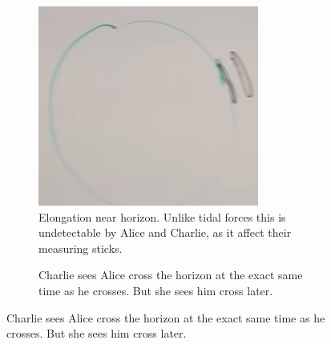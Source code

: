 \documentclass[]{article}
\begin{document}
{\begin{figure}[H]
	\caption{Alice and Charlie at the Event Horizon}
	\begin{subfigure}[t]{0.3\textwidth}
		\caption{Elongation near horizon. Unlike tidal forces this is undetectable by Alice and Charlie, as it affect their measuring sticks.}\label{fig:gr-6-elongation}
		\includegraphics[width=\textwidth]{gr-6-elongation}
	\end{subfigure}
	\;
	\begin{subfigure}[t]{0.3\textwidth}
		\caption{Charlie sees Alice cross the horizon at the exact same time as he crosses. But she sees him cross later.}\label{fig:gr-7-alice-charlie-crossing-horizon} 

\end{subfigure}
\end{figure}}
\end{document}
